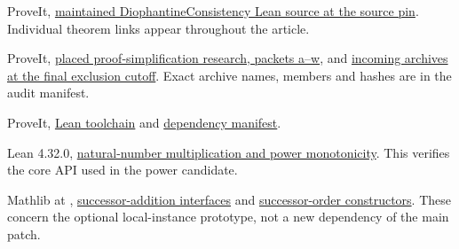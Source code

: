 \documentclass[11pt,letterpaper]{article}
\newcommand{\code}[1]{\texttt{\small\detokenize{#1}}}
\begin{document}
\begin{enumerate}[label={[\arabic*]}]
\item ProveIt, \href{https://github.com/VladimirReshetnikov/ProveIt/tree/89226e3921bce3e8949fadd12d3efb6914c7630c/Computability/DiophantineConsistency/Lean/DiophantineConsistency}{maintained DiophantineConsistency Lean source at the source pin}. Individual theorem links appear throughout the article.
\item ProveIt, \href{https://github.com/VladimirReshetnikov/ProveIt/tree/7df43cdfacb490cd3ca3acd23e39027efebf8801/Computability/DiophantineConsistency/research/lean-proof-simplification}{placed proof-simplification research, packets a--w}, and \href{https://github.com/VladimirReshetnikov/ProveIt/tree/7df43cdfacb490cd3ca3acd23e39027efebf8801/docs/incoming}{incoming archives at the final exclusion cutoff}. Exact archive names, members and hashes are in the audit manifest.
\item ProveIt, \href{https://github.com/VladimirReshetnikov/ProveIt/blob/89226e3921bce3e8949fadd12d3efb6914c7630c/lean-toolchain}{Lean toolchain} and \href{https://github.com/VladimirReshetnikov/ProveIt/blob/89226e3921bce3e8949fadd12d3efb6914c7630c/lake-manifest.json}{dependency manifest}.
\item Lean 4.32.0, \href{https://github.com/leanprover/lean4/blob/v4.32.0/src/Init/Data/Nat/Basic.lean\#L751-L819}{natural-number multiplication and power monotonicity}. This verifies the core API used in the power candidate.
\item Mathlib at \code{81a5d257}, \href{https://github.com/leanprover-community/mathlib4/blob/81a5d257c8e410db227a6665ed08f64fea08e997/Mathlib/Algebra/Order/SuccPred.lean}{successor-addition interfaces} and \href{https://github.com/leanprover-community/mathlib4/blob/81a5d257c8e410db227a6665ed08f64fea08e997/Mathlib/Order/SuccPred/Basic.lean}{successor-order constructors}. These concern the optional local-instance prototype, not a new dependency of the main patch.
\end{enumerate}
\end{document}
